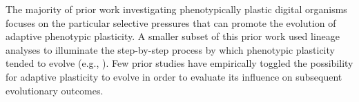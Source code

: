 
The majority of prior work investigating phenotypically plastic digital organisms focuses on the particular selective pressures that can promote the evolution of adaptive phenotypic plasticity.
A smaller subset of this prior work used lineage analyses to illuminate the step-by-step process by which phenotypic plasticity tended to evolve (e.g., \citealt{grabowski_case_2013,goldsby_evolutionary_2014,pontes_evolutionary_2019}). 
Few prior studies have empirically toggled the possibility for adaptive plasticity to evolve in order to evaluate its influence on subsequent evolutionary outcomes.



% 

